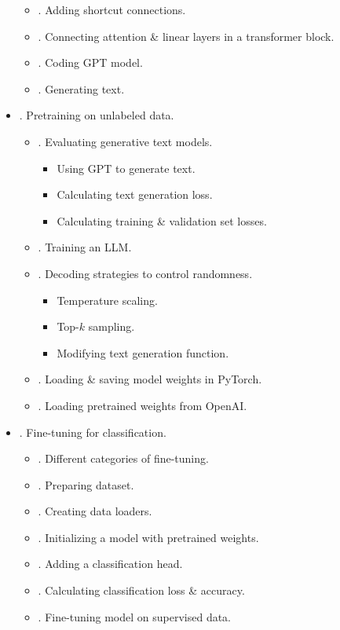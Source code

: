 \documentclass{article}
\begin{document}
\begin{itemize}
\begin{itemize}
		\item {. Adding shortcut connections.}
		\item {. Connecting attention \& linear layers in a transformer block.}
		\item {. Coding GPT model.}
		\item {. Generating text.}
	\end{itemize}
	\item {. Pretraining on unlabeled data.}
	\begin{itemize}
		\item {. Evaluating generative text models.}
		\begin{itemize}
			\item {\sf Using GPT to generate text.}
			\item {\sf Calculating text generation loss.}
			\item {\sf Calculating training \& validation set losses.}
		\end{itemize}
		\item {. Training an LLM.}
		\item {. Decoding strategies to control randomness.}
		\begin{itemize}
			\item {\sf Temperature scaling.}
			\item {\sf Top-$k$ sampling.}
			\item {\sf Modifying text generation function.}
		\end{itemize}
		\item {. Loading \& saving model weights in PyTorch.}
		\item {. Loading pretrained weights from OpenAI.}
	\end{itemize}
	\item {. Fine-tuning for classification.}
	\begin{itemize}
		\item {. Different categories of fine-tuning.}
		\item {. Preparing dataset.}
		\item {. Creating data loaders.}
		\item {. Initializing a model with pretrained weights.}
		\item {. Adding a classification head.}
		\item {. Calculating classification loss \& accuracy.}
		\item {. Fine-tuning model on supervised data.}

\end{itemize}
\end{itemize}
\end{document}
